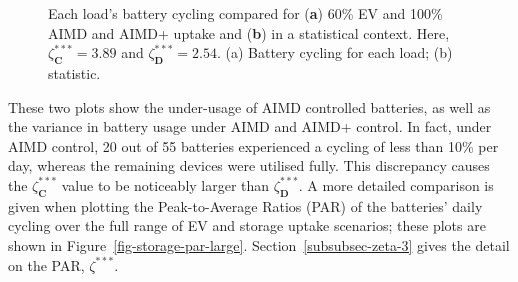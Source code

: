 \begin{figure}[!h]\centering
 \hspace{5mm}
 \vspace{-6pt}
 \caption{Each load's battery cycling compared for (\textbf{a}) 60\% EV and 100\% AIMD and AIMD+ uptake  and (\textbf{b}) in a statistical context. Here, $\zeta_\textbf{C}^{***}=3.89$ and $\zeta_\textbf{D}^{***}=2.54$. ({a}) Battery cycling for each load; ({b}) statistic. }
 \label{fig-battery-cycling}
\end{figure}

These two plots show the under-usage of AIMD controlled batteries, as well as the variance in battery usage under AIMD and AIMD+ control. In fact, under AIMD control, 20 out of 55 batteries experienced a cycling of less than 10\% per day, whereas the remaining devices were utilised fully. This discrepancy causes the $\zeta_\textbf{C}^{***}$ value to be noticeably larger than $\zeta_\textbf{D}^{***}$. A more detailed comparison is given when plotting the Peak-to-Average Ratios (PAR) of the batteries' daily cycling over the full range of EV and storage uptake scenarios; these plots are shown in Figure~\ref{fig-storage-par-large}. Section~\ref{subsubsec-zeta-3} gives the detail on the PAR, $\zeta^{***}$.\vspace{-12pt}


